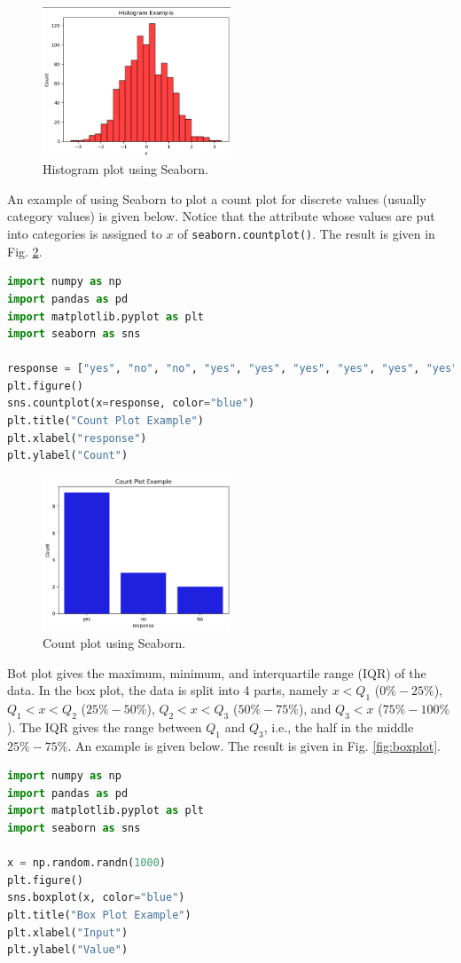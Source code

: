 \begin{figure}[htbp]
	\centering
	\includegraphics[width=0.5\textwidth]{./chapters/ch-python/figures/normhistexp.png}
	\caption{Histogram plot using Seaborn.}
	\label{fig:normhistexp}
\end{figure}

An example of using Seaborn to plot a count plot for discrete values (usually category values) is given below. Notice that the attribute whose values are put into categories is assigned to $x$ of \verb|seaborn.countplot()|. The result is given in Fig. \ref{fig:countplot}.
\begin{lstlisting}[language=Python]
import numpy as np
import pandas as pd
import matplotlib.pyplot as plt
import seaborn as sns

response = ["yes", "no", "no", "yes", "yes", "yes", "yes", "yes", "yes", "no", "yes", "yes", "NA", "NA"]
plt.figure()
sns.countplot(x=response, color="blue")
plt.title("Count Plot Example")
plt.xlabel("response")
plt.ylabel("Count")
\end{lstlisting}

\begin{figure}[htbp]
	\centering
	\includegraphics[width=0.5\textwidth]{./chapters/ch-python/figures/countplotexp.png}
	\caption{Count plot using Seaborn.}
	\label{fig:countplot}
\end{figure}

Bot plot gives the maximum, minimum, and interquartile range (IQR) of the data. In the box plot, the data is split into 4 parts, namely $x<Q_1$ ($0\%-25\%$), $Q_1<x<Q_2$ ($25\%-50\%$), $Q_2<x<Q_3$ ($50\%-75\%$), and $Q_3<x$ ($75\%-100\%$). The IQR gives the range between $Q_1$ and $Q_3$, i.e., the half in the middle $25\%-75\%$. An example is given below. The result is given in Fig. \ref{fig:boxplot}.
\begin{lstlisting}[language=Python]
import numpy as np
import pandas as pd
import matplotlib.pyplot as plt
import seaborn as sns

x = np.random.randn(1000)
plt.figure()
sns.boxplot(x, color="blue")
plt.title("Box Plot Example")
plt.xlabel("Input")
plt.ylabel("Value")
\end{lstlisting}

